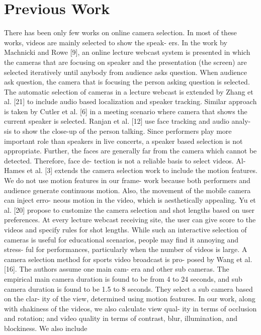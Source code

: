 \documentclass{sig-alternate}
\begin{document}
	\section{Previous Work}
	There has been only few works on online camera selection. In
	most of these works, videos are mainly selected to show the speak-
	ers. In the work by Machnicki and Rowe [9], an online lecture
	webcast system is presented in which the cameras that are focusing
	on speaker and the presentation (the screen) are selected iteratively
	until anybody from audience asks question. When audience ask
	question, the camera that is focusing the person asking question is
	selected. The automatic selection of cameras in a lecture webcast
	is extended by Zhang et al. [21] to include audio based localization
	and speaker tracking. Similar approach is taken by Cutler et al. [6]
	in a meeting scenario where camera that shows the current speaker
	is selected. Ranjan et al. [12] use face tracking and audio analy-
	sis to show the close-up of the person talking. Since performers
	play more important role than speakers in live concerts, a speaker
	based selection is not appropriate. Further, the faces are generally
	far from the camera which cannot be detected. Therefore, face de-
	tection is not a reliable basis to select videos.
	Al-Hames et al. [3] extends the camera selection work to include
	the motion features. We do not use motion features in our frame-
	work because both performers and audience generate continuous
	motion. Also, the movement of the mobile camera can inject erro-
	neous motion in the video, which is aesthetically appealing. Yu et
	al. [20] propose to customize the camera selection and shot lengths
	based on user preferences. At every lecture webcast receiving site,
	the user can give score to the videos and specify rules for shot
	lengths. While such an interactive selection of cameras is useful
	for educational scenarios, people may find it annoying and stress-
	ful for performances, particularly when the number of videos is
	large.
	A camera selection method for sports video broadcast is pro-
	posed by Wang et al. [16]. The authors assume one main cam-
	era and other sub cameras. The empirical main camera duration is
	found to be from 4 to 24 seconds, and sub camera duration is found
	to be 1.5 to 8 seconds. They select a sub camera based on the clar-
	ity of the view, determined using motion features. In our work,
	along with shakiness of the videos, we also calculate view qual-
	ity in terms of occlusion and rotation; and video quality in terms
	of contrast, blur, illumination, and blockiness. We also include
\end{document}
